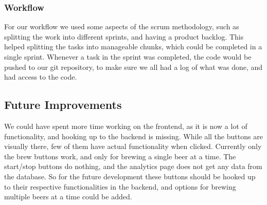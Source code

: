 \subsubsection{Workflow}
For our workflow we used some aspects of the scrum methodology, such as splitting the work into different sprints, and having a product backlog.
This helped splitting the tasks into manageable chunks, which could be completed in a single sprint.
Whenever a task in the sprint was completed, the code would be pushed to our git repository,
to make sure we all had a log of what was done, and had access to the code.

\subsection{Future Improvements}
We could have spent more time working on the frontend, as it is now a lot of functionality, 
and hooking up to the backend is missing. While all the buttons are visually there,
few of them have actual functionality when clicked. \newline
Currently only the brew buttons work, and only for brewing a single beer at a time.
The start/stop buttons do nothing, and the analytics page does not get any data from the database.
\newline
So for the future development these buttons should be hooked up to their respective functionalities in the backend,
and options for brewing multiple beers at a time could be added.